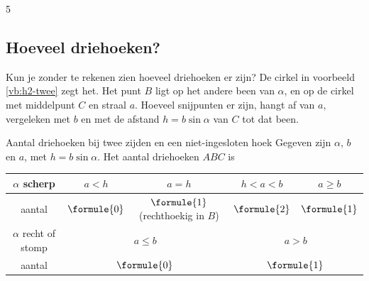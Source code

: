 \begin{alleenvoor}{5}
\subsection{Hoeveel driehoeken?}

Kun je zonder te rekenen zien hoeveel driehoeken er zijn? De cirkel in voorbeeld \ref{vb:h2-twee} zegt het. Het punt $B$ ligt op het andere been van $\alpha$, en op de cirkel met middelpunt $C$ en straal $a$. Hoeveel snijpunten er zijn, hangt af van $a$, vergeleken met $b$ en met de afstand $h = b\sin\alpha$ van $C$ tot dat been.

\begin{theorie}
\begin{stelling}{Aantal driehoeken bij twee zijden en een niet-ingesloten hoek}
Gegeven zijn $\alpha$, $b$ en $a$, met $h = b\sin\alpha$. Het aantal driehoeken $ABC$ is

\vspace{1mm}
\centering
\renewcommand{\arraystretch}{1.35}
\begin{tabular}{|c|c|c|c|c|}
\hline
$\alpha$ scherp & $a < h$ & $a = h$ & $h < a < b$ & $a \geqslant b$ \\ \hline
aantal & $\formule{0}$ & $\formule{1}$ (rechthoekig in $B$) & $\formule{2}$ & $\formule{1}$ \\ \hline\hline
$\alpha$ recht of stomp & \multicolumn{2}{c|}{$a \leqslant b$} & \multicolumn{2}{c|}{$a > b$} \\ \hline
aantal & \multicolumn{2}{c|}{$\formule{0}$} & \multicolumn{2}{c|}{$\formule{1}$} \\ \hline
\end{tabular}
\end{stelling}

\begin{bewijs}
\end{bewijs}
\end{theorie}
\end{alleenvoor}
